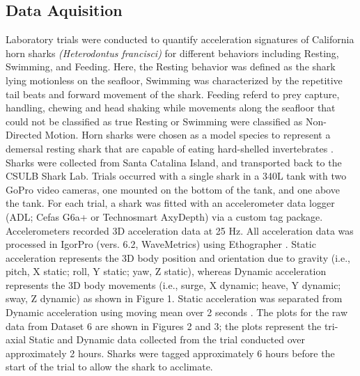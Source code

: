 \documentclass[conference]{IEEEtran}
\begin{document}
\subsection{Data Aquisition}
Laboratory trials were conducted to quantify acceleration signatures of California horn sharks \textit{(Heterodontus francisci)} for different behaviors including Resting, Swimming, and Feeding. Here, the Resting behavior was defined as the shark lying motionless on the seafloor, Swimming was characterized by the repetitive tail beats and forward movement of the shark. Feeding referd to prey capture, handling, chewing and head shaking while movements along the seafloor that could not be classified as true Resting or Swimming were classified as Non-Directed Motion. Horn sharks were chosen as a model species to represent a demersal resting shark that are capable of eating hard-shelled invertebrates \cite{string, ed, summers}. Sharks were collected from Santa Catalina Island, and transported back to the CSULB Shark Lab. Trials occurred with a single shark in a 340L tank with two GoPro video cameras, one mounted on the bottom of the tank, and one above the tank. For each trial, a shark was fitted with an accelerometer data logger (ADL; Cefas G6a+ or Technosmart AxyDepth) via a custom tag package. Accelerometers recorded 3D acceleration data at 25 Hz. All acceleration data was processed in IgorPro (vers. 6.2, WaveMetrics) using Ethographer \cite{sak}. Static acceleration represents the 3D body position and orientation due to gravity (i.e., pitch, X static; roll, Y static; yaw, Z static), whereas Dynamic acceleration represents the 3D body movements (i.e., surge, X dynamic; heave, Y dynamic; sway, Z dynamic) as shown in Figure 1. Static acceleration was separated from Dynamic acceleration using moving mean over 2 seconds \cite{shep}. The plots for the raw data from Dataset 6 are shown in Figures 2 and 3; the plots represent the tri-axial Static and Dynamic data collected from the trial conducted over approximately 2 hours. Sharks were tagged approximately 6 hours before the start of the trial to allow the shark to acclimate. 
\end{document}
